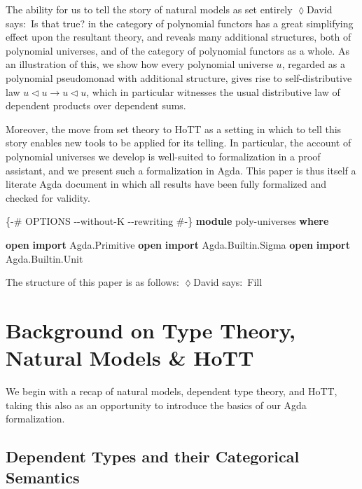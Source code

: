 \documentclass[
  11pt,
  oneside,
  article]{memoir}
\newenvironment{Shaded}{}{}
\newcommand{\KeywordTok}[1]{\textcolor[rgb]{0.00,0.44,0.13}{\textbf{#1}}}
\newcommand{\NormalTok}[1]{#1}
\newcommand{\OtherTok}[1]{\textcolor[rgb]{0.00,0.44,0.13}{#1}}
\newcommand{\PreprocessorTok}[1]{\textcolor[rgb]{0.74,0.48,0.00}{#1}}
\theoremstyle{definition}
\theoremstyle{plain}
\newcommand{\0}{\textsf{0}}
\newcommand{\1}{\tn{\textsf{1}}}
\newcommand{\tri}{\mathbin{\triangleleft}}
\newcommand{\dnote}[1]{{\quad \color{blue}$\lozenge$\;David says:}~#1\;{\color{blue}$\lozenge$}\quad}
\begin{document}
The ability for us to tell the story of natural models as set entirely \dnote{Is that true?}
in the category of polynomial functors has a great simplifying effect
upon the resultant theory, and reveals many additional structures, both
of polynomial universes, and of the category of polynomial functors as a
whole. As an illustration of this, we show how every polynomial universe
\(u\), regarded as a polynomial pseudomonad with additional structure,
gives rise to self-distributive law \(u\tri u\to u\tri u\), which in
particular witnesses the usual distributive law of dependent products
over dependent sums.

Moreover, the move from set theory to HoTT as a setting in which to tell
this story enables new tools to be applied for its telling. In
particular, the account of polynomial universes we develop is
well-suited to formalization in a proof assistant, and we present such a
formalization in Agda. This paper is thus itself a literate Agda
document in which all results have been fully formalized and checked for
validity.

\begin{Shaded}
\begin{Highlighting}[]
\PreprocessorTok{\{{-}\# OPTIONS {-}{-}without{-}K {-}{-}rewriting \#{-}\}}
\KeywordTok{module}\NormalTok{ poly{-}universes }\KeywordTok{where}

\KeywordTok{open} \KeywordTok{import}\NormalTok{ Agda}\OtherTok{.}\NormalTok{Primitive}
\KeywordTok{open} \KeywordTok{import}\NormalTok{ Agda}\OtherTok{.}\NormalTok{Builtin}\OtherTok{.}\NormalTok{Sigma}
\KeywordTok{open} \KeywordTok{import}\NormalTok{ Agda}\OtherTok{.}\NormalTok{Builtin}\OtherTok{.}\NormalTok{Unit}
\end{Highlighting}
\end{Shaded}

The structure of this paper is as follows:
\dnote{Fill}

\chapter{Background on Type Theory, Natural Models \&
HoTT}\label{background-on-type-theory-natural-models-hott}

We begin with a recap of natural models, dependent type theory, and
HoTT, taking this also as an opportunity to introduce the basics of our
Agda formalization.

\section{Dependent Types and their Categorical
Semantics}\label{dependent-types-and-their-categorical-semantics}
\end{document}
